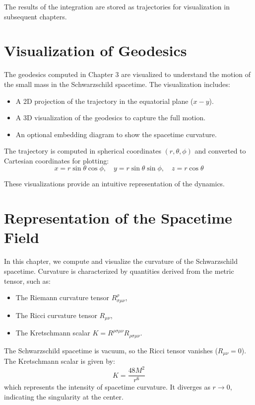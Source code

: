 \documentclass[12pt]{article}
\begin{document}
The results of the integration are stored as trajectories for visualization in subsequent chapters.

\newpage

\section{Visualization of Geodesics}

The geodesics computed in Chapter 3 are visualized to understand the motion of the small mass in the Schwarzschild spacetime. The visualization includes:
\begin{itemize}
    \item A 2D projection of the trajectory in the equatorial plane (\(x-y\)).
    \item A 3D visualization of the geodesics to capture the full motion.
    \item An optional embedding diagram to show the spacetime curvature.
\end{itemize}

The trajectory is computed in spherical coordinates \((r, \theta, \phi)\) and converted to Cartesian coordinates for plotting:
\[
x = r \sin\theta \cos\phi, \quad y = r \sin\theta \sin\phi, \quad z = r \cos\theta
\]

These visualizations provide an intuitive representation of the dynamics.

\newpage

\section{Representation of the Spacetime Field}

In this chapter, we compute and visualize the curvature of the Schwarzschild spacetime. Curvature is characterized by quantities derived from the metric tensor, such as:
\begin{itemize}
    \item The Riemann curvature tensor \(R^\rho_{\sigma\mu\nu}\),
    \item The Ricci curvature tensor \(R_{\mu\nu}\),
    \item The Kretschmann scalar \(K = R^{\rho\sigma\mu\nu} R_{\rho\sigma\mu\nu}\).
\end{itemize}

The Schwarzschild spacetime is vacuum, so the Ricci tensor vanishes (\(R_{\mu\nu} = 0\)). The Kretschmann scalar is given by:
\[
K = \frac{48M^2}{r^6}
\]
which represents the intensity of spacetime curvature. It diverges as \(r \to 0\), indicating the singularity at the center.
\end{document}

